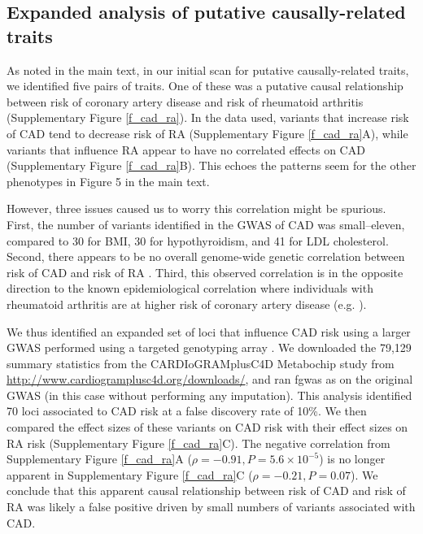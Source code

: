 \documentclass[11pt,titlepage]{article}
\begin{document}
\subsection{Expanded analysis of putative causally-related traits}
As noted in the main text, in our initial scan for putative causally-related traits, we identified five pairs of traits. One of these was a putative causal relationship between risk of coronary artery disease and risk of rheumatoid arthritis (Supplementary Figure \ref{f_cad_ra}). In the data used, variants that increase risk of CAD tend to decrease risk of RA (Supplementary Figure \ref{f_cad_ra}A), while variants that influence RA appear to have no correlated effects on CAD (Supplementary Figure \ref{f_cad_ra}B). This echoes the patterns seem for the other phenotypes in Figure 5 in the main text. 

However, three issues caused us to worry this correlation might be spurious. First, the number of variants identified in the GWAS of CAD was small--eleven, compared to 30 for BMI, 30 for hypothyroidism, and 41 for LDL cholesterol. Second, there appears to be no overall genome-wide genetic correlation between risk of CAD and risk of RA \citep{bulik2015atlas}. Third, this observed correlation is in the opposite direction to the known epidemiological correlation where individuals with rheumatoid arthritis are at higher risk of coronary artery disease (e.g. \citet{Maradit-Kremers:2005aa}). 

We thus identified an expanded set of loci that influence CAD risk using a larger GWAS performed using a targeted genotyping array \citep{CARDIoGRAMplusC4D-Consortium:2013aa}. We downloaded the 79,129 summary statistics from the CARDIoGRAMplusC4D Metabochip study \citep{CARDIoGRAMplusC4D-Consortium:2013aa} from \url{http://www.cardiogramplusc4d.org/downloads/}, and ran fgwas as on the original GWAS (in this case without performing any imputation). This analysis identified 70 loci associated to CAD risk at a false discovery rate of 10\%. We then compared the effect sizes of these variants on CAD risk with their effect sizes on RA risk (Supplementary Figure \ref{f_cad_ra}C). The negative correlation from Supplementary Figure \ref{f_cad_ra}A ($\rho = -0.91, P = 5.6 \times 10^{-5}$) is no longer apparent in Supplementary Figure \ref{f_cad_ra}C ($\rho = -0.21, P = 0.07$). We conclude that this apparent causal relationship between risk of CAD and risk of RA was likely a false positive driven by small numbers of variants associated with CAD. 
\end{document}
